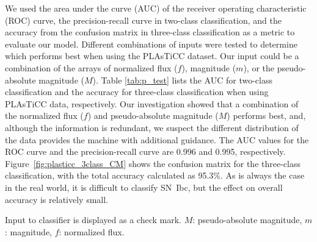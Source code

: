 \documentclass[proof]{pasj01}
\begin{document}
We used the area under the curve (AUC) of the receiver operating characteristic (ROC) curve, the precision-recall curve in two-class classification, and the accuracy from the confusion matrix in three-class classification as a metric to evaluate our model.
Different combinations of inputs were tested to determine which performs best when using the PLAsTiCC dataset. Our input could be a combination of the arrays of normalized flux ($f$), magnitude ($m$), or the pseudo-absolute magnitude ($M$).
Table \ref{tab:p_test} lists the AUC for two-class classification and the accuracy for three-class classification when using PLAsTiCC data, respectively.
Our investigation showed that a combination of the normalized flux ($f$) and pseudo-absolute magnitude ($M$) performs best, and, although the information is redundant, we suspect the different distribution of the data provides the machine with additional guidance.
The AUC values for the ROC curve and the precision-recall curve are 0.996 and 0.995, respectively.
Figure\ \ref{fig:plasticc_3class_CM} shows the confusion matrix for the three-class classification, with the total accuracy calculated as 95.3\%.
As is always the case in the real world, it is difficult to classify SN~Ibc, but the effect on overall accuracy is relatively small.
%
\begin{table}[htbp]
\label{tab:p_test}
\begin{tabnote}
\footnotemark[$*$] Input to classifier is displayed as a check mark. $M$: pseudo-absolute magnitude, $m$: magnitude, $f$: normalized flux.
\end{tabnote}
\end{table}
\end{document}

